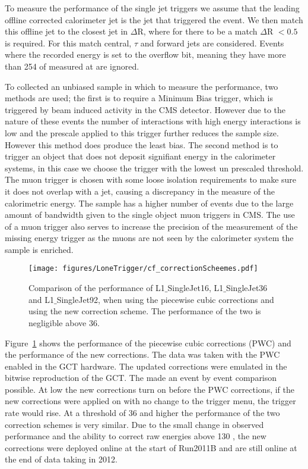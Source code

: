 To measure the performance of the \Lone single jet triggers we assume that the leading offline corrected \AK calorimeter jet is the jet that triggered the event. We then match this offline jet to the closest \Lone jet in $\Delta$R, where for there to be a match $\Delta$R $< 0.5$ is required. For this match central, $\tau$ and forward jets are considered. Events where the recorded \Lone energy is set to the overflow bit, meaning they have more than 254 \GeV of \ET measured at \Lone are ignored.

To collected an unbiased sample in which to measure the performance, two methods are used; the first is to require a Minimum Bias trigger, which is triggered by beam induced activity in the CMS detector.
However due to the nature of these events the number of interactions with high energy interactions is low and the prescale applied to this trigger further reduces the sample size. However this method does produce the least bias.
The second method is to trigger an object that does not deposit signifiant energy in the calorimeter systems, in this case we choose the trigger with the lowest un prescaled \PT threshold. The muon trigger is chosen with some loose isolation requirements to make sure it does not overlap with a jet, causing a discrepancy in the measure of the calorimetric energy. The sample has a higher number of events due to the large amount of bandwidth given to the single object muon triggers in CMS. The use of a muon trigger also serves to increase the precision of the measurement of the \Lone missing energy trigger as the muons are not seen by the calorimeter system the \MET sample is enriched.

\begin{figure}[htbp]
  \centering
    \texttt{[image: figures/LoneTrigger/cf\_correctionScheemes.pdf]}
  \caption{Comparison of the performance of L1$\_$SingleJet16, L1$\_$SingleJet36 and L1$\_$SingleJet92, when using the piecewise cubic corrections and using the new correction scheme. The performance of the two is negligible above 36\GeV.}
  \label{fig:figures_LoneTrigger_cf_correctionScheemes}
\end{figure}

Figure~\ref{fig:figures_LoneTrigger_cf_correctionScheemes} shows the performance of the piecewise cubic corrections (PWC) and the performance of the new corrections. The data was taken with the PWC enabled in the GCT hardware. The updated corrections were emulated in the bitwise reproduction of the GCT. The made an event by event comparison possible. At low \ET the new corrections turn on before the PWC corrections, if the new corrections were applied on with no change to the trigger menu, the \Lone trigger rate would rise. At a threshold of 36 \GeV and higher the performance of the two correction schemes is very similar. Due to the small change in observed performance and the ability to correct raw energies above 130 \GeV, the new corrections were deployed online at the start of Run2011B and are still online at the end of data taking in 2012.

